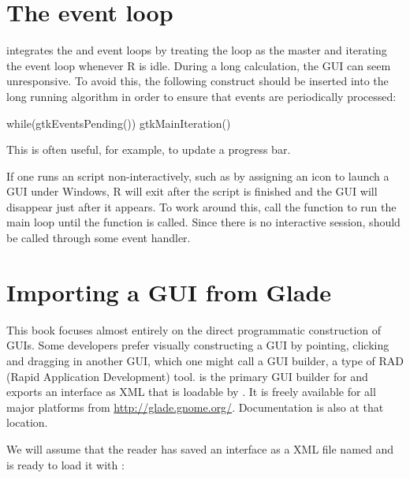 
\section{The event loop}

 integrates the \GTK\/ and \R\/ event loops by treating the
\R\/ loop as the master and iterating the \GTK\/ event loop whenever R
is idle.  During a long calculation, the GUI can seem unresponsive. To
avoid this, the following construct should be inserted into the long
running algorithm in order to ensure that \GTK\/ events are
periodically processed:
\begin{Schunk}
\begin{Sinput}
 while(gtkEventsPending()) 
   gtkMainIteration()
\end{Sinput}
\end{Schunk}
This is often useful, for example, to update a progress bar.

If one runs an  script non-interactively, such as by
assigning an icon to launch a GUI under Windows, R will exit after
the script is finished and the GUI will disappear just after it
appears. To work around this, call the function  to
run the main loop until the function  is
called. Since there is no interactive session, 
should be called through some event handler.

\section{Importing a GUI from Glade}
\label{sec:gtk-glade}


This book focuses almost entirely on the direct programmatic
construction of GUIs. Some developers prefer visually constructing a
GUI by pointing, clicking and dragging in another GUI, which one might
call a GUI builder, a type of RAD (Rapid Application Development)
tool.  is the primary GUI builder for \GTK\/ and
exports an interface as XML that is loadable by . It
is freely available for all major platforms from
\url{http://glade.gnome.org/}. Documentation is also at that
location. 

We will assume that the reader has saved an interface as a
 XML file named  and is ready to
load it with :
\begin{Schunk}
\end{Schunk}

